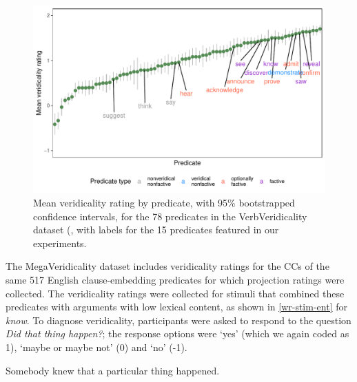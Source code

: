 \documentclass{language}
\newcommand{\6}{\mbox{$[\hspace*{-.6mm}[$}}
\newcommand{\9}{\mbox{$]\hspace*{-.6mm}]$}}
\begin{document}
\begin{figure}[H]
\centering
\includegraphics[width=.77\paperwidth]{Language-figures/color/Figure16.pdf}

\caption{Mean veridicality rating by predicate, with 95\% bootstrapped confidence intervals, for the 78 predicates in the VerbVeridicality dataset (\citealt{ross-pavlick2019}, with labels for the 15 predicates featured in our experiments.}
\label{f-vv-projectivity}
\end{figure}

The MegaVeridicality dataset includes veridicality ratings for the CCs of the same 517 English clause-embedding predicates for which projection ratings were collected. The veridicality ratings were collected for stimuli that combined these predicates with arguments with low lexical content, as shown in \ref{wr-stim-ent} for {\em know}. To diagnose veridicality, participants were asked to respond to the question {\em Did that thing happen?}; the response options were `yes' (which we again coded as 1), `maybe or maybe not' (0) and `no' (-1).

\begin{exe}
\ex\label{wr-stim-ent} Somebody knew that a particular thing happened.
\end{exe}
\end{document}
